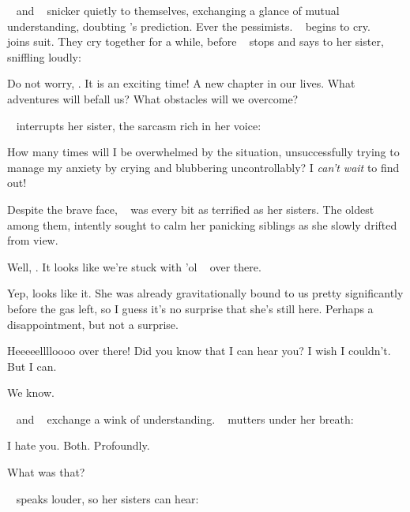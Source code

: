 \documentclass[main.tex]{subfiles}
\begin{document}
\par \nar \rmtaygete~ and \rmalcyone~ snicker quietly to themselves, exchanging a glance of mutual understanding, doubting \rmmaia's prediction.  Ever the pessimists.  \rmelectra~ begins to cry.  \rmsterope~ joins suit.  They cry together for a while, before \rmsterope~ stops and says to her sister, sniffling loudly:

\par \Sterope Do not worry, \rmelectra.  It is an exciting time!  A new chapter in our lives.  What adventures will befall us?  What obstacles will we overcome?  

\par \nar \rmelectra~ interrupts her sister, the sarcasm rich in her voice:

\par \Electra How many times will I be overwhelmed by the situation, unsuccessfully trying to manage my anxiety by crying and blubbering uncontrollably? I \textit{can't wait} to find out!

\par \nar Despite the brave face, \rmmaia~ was every bit as terrified as her sisters.  The oldest among them, \rmmaia intently sought to calm her panicking siblings as she slowly drifted from view.

\par \Taygete Well, \rmalcyone.  It looks like we're stuck with 'ol \rmcelaeno~ over there.

\par \Alcyone Yep, looks like it.  She was already gravitationally bound to us pretty significantly before the gas left, so I guess it's no surprise that she's still here.  Perhaps a disappointment, but not a surprise.

\par \Celaeno Heeeeelllloooo over there!  Did you know that I can hear you?  I wish I couldn't.  But I can.  

\par \Taygete We know. 

\par \nar \rmtaygete~ and \rmalcyone~ exchange a wink of understanding.  \rmcelaeno~ mutters under her breath:

\par \Celaeno I hate you.  Both.  Profoundly.

\par \Taygete What was that?

\par \nar \rmcelaeno~ speaks louder, so her sisters can hear:
\end{document}
